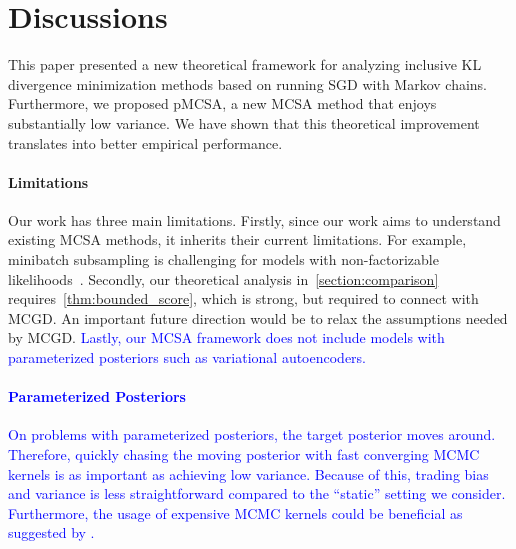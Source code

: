 
\vspace{-1.5ex}
\section{Discussions}\label{section:discussion}
\vspace{-1.5ex}
This paper presented a new theoretical framework for analyzing inclusive KL divergence minimization methods based on running SGD with Markov chains.
Furthermore, we proposed pMCSA, a new MCSA method that enjoys substantially low variance.
We have shown that this theoretical improvement translates into better empirical performance.

\vspace{-1.5ex}
\paragraph{Limitations}
Our work has three main limitations.
Firstly, since our work aims to understand existing MCSA methods, it inherits their current limitations.
For example, minibatch subsampling is challenging for models with non-factorizable likelihoods~\citep{NEURIPS2020_b2070693}.
Secondly, our theoretical analysis in~\cref{section:comparison} requires~\cref{thm:bounded_score}, which is strong, but required to connect with MCGD.
An important future direction would be to relax the assumptions needed by MCGD.
\textcolor{blue}{%
Lastly, our MCSA framework does not include models with parameterized posteriors such as variational autoencoders.
}

\vspace{-4ex}
\textcolor{blue}{
\vspace{-1.5ex}
\paragraph{Parameterized Posteriors}
On problems with parameterized posteriors, the target posterior moves around.
Therefore, quickly chasing the moving posterior with fast converging MCMC kernels is as important as achieving low variance.
Because of this, trading bias and variance is less straightforward compared to the ``static'' setting we consider.
Furthermore, the usage of expensive MCMC kernels could be beneficial as suggested by \citet{zhang_transport_2022}.
}

\vspace{-1.5ex}
